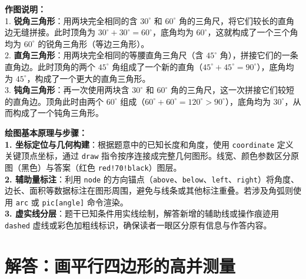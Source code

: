 \vspace{0.6cm}
{\small\color{gray}
\textbf{作图说明：}\\
1. \textbf{锐角三角形}：用两块完全相同的含 $30^\circ$ 和 $60^\circ$ 角的三角尺，将它们较长的直角边无缝拼接。此时顶角为 $30^\circ + 30^\circ = 60^\circ$，底角均为 $60^\circ$，这就构成了一个三个角均为 $60^\circ$ 的锐角三角形（等边三角形）。\\
2. \textbf{直角三角形}：用两块完全相同的等腰直角三角尺（含 $45^\circ$ 角），拼接它们的一条直角边。此时顶角的两个 $45^\circ$ 角组成了一个新的直角（$45^\circ + 45^\circ = 90^\circ$），底角均为 $45^\circ$，构成了一个更大的直角三角形。\\
3. \textbf{钝角三角形}：再一次使用两块含 $30^\circ$ 和 $60^\circ$ 角的三角尺，这一次拼接它们较短的直角边。顶角此时由两个 $60^\circ$ 组成（$60^\circ + 60^\circ = 120^\circ>90^\circ$），底角均为 $30^\circ$，从而构成了一个钝角三角形。
}

\vspace{0.8cm}


\vspace{0.6cm}

{\small\color{blue!70!black}
\textbf{绘图基本原理与步骤：}\\
\textbf{1. 坐标定位与几何构建}：根据题意中的已知长度和角度，使用 \texttt{coordinate} 定义关键顶点坐标，通过 \texttt{draw} 指令按序连接成完整几何图形。线宽、颜色参数区分原图（黑色）与答案（红色 \texttt{red!70!black}）图层。\\
\textbf{2. 辅助量标注}：利用 \texttt{node} 的方向锚点（\texttt{above}、\texttt{below}、\texttt{left}、\texttt{right}）将角度、边长、面积等数据标注在图形周围，避免与线条或其他标注重叠。若涉及角弧则使用 \texttt{arc} 或 \texttt{pic[angle]} 命令渲染。\\
\textbf{3. 虚实线分层}：题干已知条件用实线绘制，解答新增的辅助线或操作痕迹用 \texttt{dashed} 虚线或彩色加粗线标识，确保读者一眼区分原有信息与作答内容。
}

\newpage




\newpage

\section{解答：画平行四边形的高并测量}

\vspace{0.4cm}

